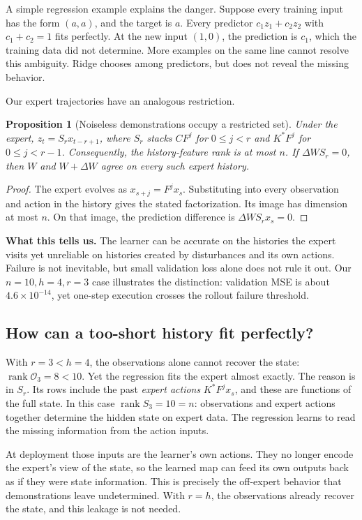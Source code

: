 \documentclass[12 pt]{article}        	%
\newtheorem{proposition}[theorem]{Proposition}
\theoremstyle{definition}
\DeclareMathOperator{\rank}{rank}
\begin{document}
A simple regression example explains the danger. Suppose every training input has the form $(a,a)$, and the target is $a$. Every predictor $c_1z_1+c_2z_2$ with $c_1+c_2=1$ fits perfectly. At the new input $(1,0)$, the prediction is $c_1$, which the training data did not determine. More examples on the same line cannot resolve this ambiguity. Ridge chooses among predictors, but does not reveal the missing behavior.

Our expert trajectories have an analogous restriction.
\begin{proposition}[Noiseless demonstrations occupy a restricted set]
Under the expert, $z_t=S_rx_{t-r+1}$, where $S_r$ stacks $CF^j$ for $0\le j<r$ and $K^*F^j$ for $0\le j<r-1$. Consequently, the history-feature rank is at most $n$. If $\Delta WS_r=0$, then $W$ and $W+\Delta W$ agree on every such expert history.
\end{proposition}
\begin{proof}
The expert evolves as $x_{s+j}=F^jx_s$. Substituting into every observation and action in the history gives the stated factorization. Its image has dimension at most $n$. On that image, the prediction difference is $\Delta WS_rx_s=0$.
\end{proof}

\textbf{What this tells us.} The learner can be accurate on the histories the expert visits yet unreliable on histories created by disturbances and its own actions. Failure is not inevitable, but small validation loss alone does not rule it out. Our $n=10,h=4,r=3$ case illustrates the distinction: validation MSE is about $4.6\times10^{-14}$, yet one-step execution crosses the rollout failure threshold.

\subsection{How can a too-short history fit perfectly?}
With $r=3<h=4$, the observations alone cannot recover the state: $\rank\mathcal O_3=8<10$. Yet the regression fits the expert almost exactly. The reason is in $S_r$. Its rows include the past \emph{expert actions} $K^*F^jx_s$, and these are functions of the full state. In this case $\rank S_3=10=n$: observations and expert actions together determine the hidden state on expert data. The regression learns to read the missing information from the action inputs.

At deployment those inputs are the learner's own actions. They no longer encode the expert's view of the state, so the learned map can feed its own outputs back as if they were state information. This is precisely the off-expert behavior that demonstrations leave undetermined. With $r=h$, the observations already recover the state, and this leakage is not needed.
\end{document}
